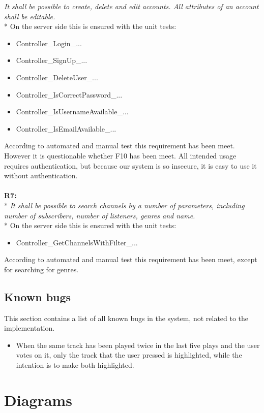 \documentclass[a4paper,11pt,report]{article}
\begin{document}
\textit{It shall be possible to create, delete and edit accounts. All attributes of an account shall be editable.} \\*
On the server side this is ensured with the unit tests:
\begin{itemize}
\item Controller\_Login\_...
\item Controller\_SignUp\_...
\item Controller\_DeleteUser\_...
\item Controller\_IsCorrectPassword\_...
\item Controller\_IsUsernameAvailable\_...
\item Controller\_IsEmailAvailable\_...
\end{itemize}
According to automated and manual test this requirement has been meet. However it is questionable whether F10 has been meet. All intended usage requires authentication, but because our system is so insecure, it is easy to use it without authentication. \\ \\
\textbf{R7:} \\*
\textit{It shall be possible to search channels by a number of parameters, including number of subscribers, number of listeners, genres and name.} \\*
On the server side this is ensured with the unit tests:
\begin{itemize}
\item Controller\_GetChannelsWithFilter\_...
\end{itemize}
According to automated and manual test this requirement has been meet, except for searching for genres.
\subsection{Known bugs}
This section contains a list of all known bugs in the system, not related to the implementation.
\begin{itemize}
\item When the same track has been played twice in the last five plays and the user votes on it, only the track that the user pressed is highlighted, while the intention is to make both highlighted.
\end{itemize}

\newpage
\section{Diagrams}
\end{document}
